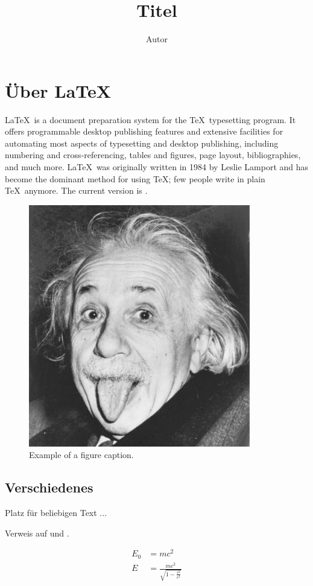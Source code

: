 \documentclass[a4paper, numbers=withenddot, 11pt]{scrartcl}
\title{Titel}
\author{Autor}
\begin{document}
\maketitle
\tableofcontents

\section{Über \LaTeX}

\LaTeX\ is a document preparation system for the \TeX\ typesetting program. It offers programmable desktop publishing features and extensive facilities for automating most aspects of typesetting and desktop publishing, including numbering and  cross-referencing, tables and figures, page layout, bibliographies, and much more. \LaTeX\ was originally written in 1984 by Leslie Lamport and has become the  dominant method for using \TeX; few people write in plain \TeX\ anymore. The current version is \LaTeXe.

\begin{figure}[htbp]
\centerline{\includegraphics[width=0.3\linewidth]{einstein}}
\caption{Example of a figure caption.}
\label{fig}
\end{figure}

\subsection{Verschiedenes}

Platz für beliebigen Text ... 



Verweis auf \cite{scheme} und \cite[17]{knuth}.

\begin{align}
E_0 &= mc^2 \\
E &= \frac{mc^2}{\sqrt{1-\frac{v^2}{c^2}}}
\end{align}

\printbibliography
\end{document}
